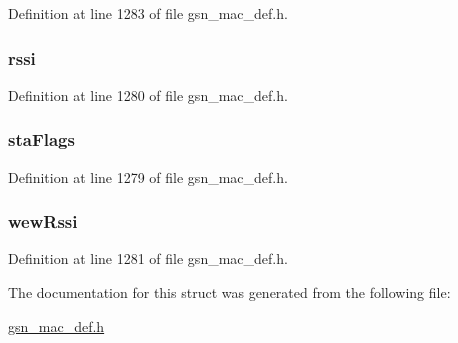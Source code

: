 Definition at line 1283 of file gsn\_\-mac\_\-def.h.

\hypertarget{a00110_a1655ee4c98e91aaf1c7714c22f3a2fcd}{
\subsubsection[{rssi}]{ {\bf rssi}}}
\label{a00110_a1655ee4c98e91aaf1c7714c22f3a2fcd}


Definition at line 1280 of file gsn\_\-mac\_\-def.h.

\hypertarget{a00110_a962a0679bf5d12791a659dfbc547a894}{
\subsubsection[{staFlags}]{ {\bf staFlags}}}
\label{a00110_a962a0679bf5d12791a659dfbc547a894}


Definition at line 1279 of file gsn\_\-mac\_\-def.h.

\hypertarget{a00110_a5d16853ddf4470888459d45288b82ff9}{
\subsubsection[{wewRssi}]{ {\bf wewRssi}}}
\label{a00110_a5d16853ddf4470888459d45288b82ff9}


Definition at line 1281 of file gsn\_\-mac\_\-def.h.



The documentation for this struct was generated from the following file:\begin{DoxyCompactItemize}
\item 
\hyperlink{a00522}{gsn\_\-mac\_\-def.h}\end{DoxyCompactItemize}
